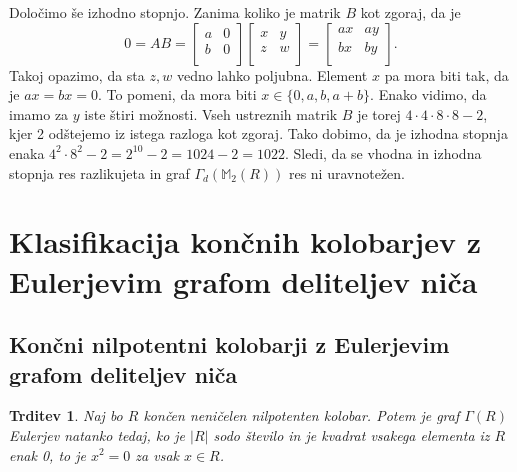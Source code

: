 \documentclass[a4paper, 12pt]{amsart}
\theoremstyle{definition} %
\theoremstyle{plain} %
\newtheorem{trditev}[definicija]{Trditev}
\newcommand{\M}{\mathbb M}
\begin{document}
Določimo še izhodno stopnjo. Zanima koliko je matrik $B$ kot zgoraj, da je 
$$
0 = AB = \begin{bmatrix}
a & 0 \\
b & 0 \\
\end{bmatrix}
\begin{bmatrix}
x & y \\
z & w \\
\end{bmatrix}
=
\begin{bmatrix}
ax & ay \\
bx & by \\
\end{bmatrix}.
$$
Takoj opazimo, da sta $z,w$ vedno lahko poljubna. Element $x$ pa mora biti tak, da je $ax = bx = 0$. To pomeni, da mora biti $x\in \{0,a,b,a+b\}$. Enako vidimo, da imamo za $y$ iste štiri možnosti. Vseh ustreznih matrik $B$ je torej $4\cdot 4 \cdot 8 \cdot 8 -2$, kjer 2 odštejemo iz istega razloga kot zgoraj. Tako dobimo, da je izhodna stopnja enaka $4^2 \cdot 8^2 - 2 = 2^{10}-2 = 1024-2 = 1022$. Sledi, da se vhodna in izhodna stopnja res razlikujeta in graf $\Gamma_d(\M_2(R))$ res ni uravnotežen.
\endproof

\section{Klasifikacija končnih kolobarjev z Eulerjevim grafom deliteljev niča}

\subsection{Končni nilpotentni kolobarji z Eulerjevim grafom deliteljev niča}

\begin{trditev}
\label{EulerNilpotenten}
Naj bo $R$ končen neničelen nilpotenten kolobar. Potem je graf $\Gamma(R)$ Eulerjev natanko tedaj, ko je $|R|$ sodo število in je kvadrat vsakega elementa iz $R$ enak 0, to je $x^2=0$ za vsak $x\in R$.
\end{trditev}
\end{document}
